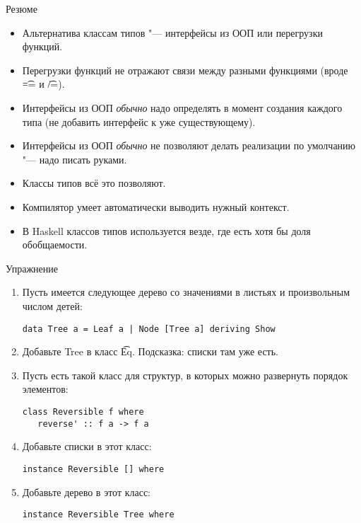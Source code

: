 \begin{frame}[fragile]{Резюме}
	\begin{itemize}
		\item Альтернатива классам типов "--- интерфейсы из ООП или перегрузки функций.
		\item Перегрузки функций не отражают связи между разными функциями (вроде \t{==} и \t{/=}).
		\item Интерфейсы из ООП \textit{обычно} надо определять в момент создания каждого типа (не добавить интерфейс к уже существующему).
		\item Интерфейсы из ООП \textit{обычно} не позволяют делать реализации по умолчанию "--- надо писать руками.
		\item Классы типов всё это позволяют.
		\item Компилятор умеет автоматически выводить нужный контекст.
		\item В Haskell классов типов используется везде, где есть хотя бы доля обобщаемости.
	\end{itemize}
\end{frame}

\begin{frame}[fragile]{Упражнение}
	\begin{enumerate}
		\item Пусть имеется следующее дерево со значениями в листьях и произвольным числом детей:
\begin{verbatim}
data Tree a = Leaf a | Node [Tree a] deriving Show
\end{verbatim}
		\item Добавьте Tree в класс \t{Eq}. Подсказка: списки там уже есть.
		\item Пусть есть такой класс для структур, в которых можно развернуть порядок элементов:
\begin{verbatim}
class Reversible f where
   reverse' :: f a -> f a
\end{verbatim}
		\item Добавьте списки в этот класс:
\begin{verbatim}
instance Reversible [] where
\end{verbatim}
		\item Добавьте дерево в этот класс:
\begin{verbatim}
instance Reversible Tree where
\end{verbatim}
	\end{enumerate}
\end{frame}
